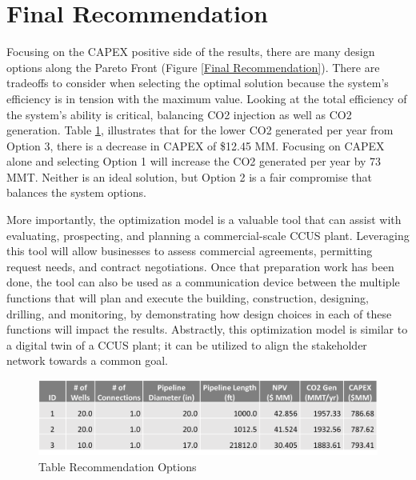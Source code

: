\documentclass[balance,upint,subscriptcorrection,varvw,mathalfa=cal=boondoxo,spanish,french,vietnamese,russian,greek,pdf-a,colorlinks]{asmeconf}
\begin{document}
\section{Final Recommendation}
Focusing on the CAPEX positive side of the results, there are many design options along the Pareto Front (Figure \ref{Final Recommendation}). There are tradeoffs to consider when selecting the optimal solution because the system's efficiency is in tension with the maximum value. Looking at the total efficiency of the system's ability is critical, balancing CO2 injection as well as CO2 generation. Table \ref{Options_Table}, illustrates that for the lower CO2 generated per year from Option 3, there is a decrease in CAPEX of \$12.45 MM. Focusing on CAPEX alone and selecting Option 1 will increase the CO2 generated per year by 73 MMT. Neither is an ideal solution, but Option 2 is a fair compromise that balances the system options. 

More importantly, the optimization model is a valuable tool that can assist with evaluating, prospecting, and planning a commercial-scale CCUS plant. Leveraging this tool will allow businesses to assess commercial agreements, permitting request needs, and contract negotiations. Once that preparation work has been done, the tool can also be used as a communication device between the multiple functions that will plan and execute the building, construction, designing, drilling, and monitoring, by demonstrating how design choices in each of these functions will impact the results. Abstractly, this optimization model is similar to a digital twin of a CCUS plant; it can be utilized to align the stakeholder network towards a common goal. 

\begin{figure}
\centering\includegraphics[width=1\linewidth]{images/Options_Table.png}
\caption{Table Recommendation Options}
\label{Options_Table}
\end{figure}
\end{document}
